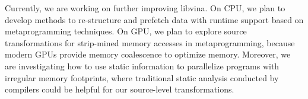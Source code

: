 
Currently, we are working on further improving libvina.
On CPU, we plan to develop methods to re-structure and
prefetch data with runtime support based on metaprogramming techniques.
On GPU, we plan to explore source
transformations for strip-mined memory accesses in metaprogramming,
because modern GPUs provide memory coalescence to optimize memory. 
Moreover,  we are investigating how to use static information
to parallelize programs with irregular memory
footprints, where traditional static analysis
conducted by compilers could be helpful for our source-level transformations.


